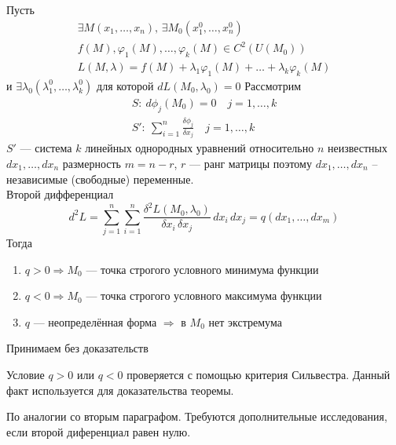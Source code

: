 \begin{Th}
    Пусть 
    \begin{gather*}
        \exists M(x_1, \dots, x_n), \, \exists M_0(x^0_1, \dots, x^0_n)\\
        f(M), \varphi_1(M), \dots, \varphi_k(M) \in C^2(U(M_0))\\
        L(M, \lambda) = f(M) + \lambda_1\varphi_1(M) + \dots + \lambda_k\varphi_k(M) 
    \end{gather*}
    и $\exists \lambda_0(\lambda^0_1, \dots, \lambda^0_k)$ для которой $ dL(M_0, \lambda_0) = 0 $ Рассмотрим
    \begin{gather*}
        S:\: d\phi_j(M_0) = 0 \quad j = 1, \dots, k\\
        S':\: \sum_{i=1}^{n} \frac{\delta\phi_j}{\delta x_j} \quad j = 1, \dots, k
    \end{gather*}
    $S'$ --- система $k$ линейных однородных уравнений относительно $n$ неизвестных $dx_1, \dots, dx_n$ размерность $m = n - r$, $r$ --- ранг матрицы поэтому $dx_1, \dots, dx_n$ -- независимые (свободные) переменные.\\
    Второй дифференциал 
    \[
        d^2L = \sum_{j = 1}^{n}\sum_{i = 1}^{n} \frac{\delta^2L(M_0, \lambda_0)}{\delta x_i\, \delta x_j}\, dx_i\, dx_j = q(dx_1, \dots, dx_m)
    \]
    Тогда
    \begin{enumerate}
        \item $q > 0 \Rightarrow M_0$ --- точка строгого условного минимума функции
        
        \item $q < 0 \Rightarrow M_0$ --- точка строгого условного максимума функции
        
        \item $q$ --- неопределённая форма $\Rightarrow$ в $M_0$ нет экстремума 
    \end{enumerate}
\end{Th}

\begin{Proof}
    Принимаем без доказательств
\end{Proof}

\begin{Note}
    Условие $q > 0$ или $q < 0$ проверяется с помощью критерия Сильвестра. Данный факт используется для доказательства теоремы. 
\end{Note}

\begin{Note}
    По аналогии со вторым параграфом. Требуются дополнительные исследования, если второй диференциал равен нулю.
\end{Note}

